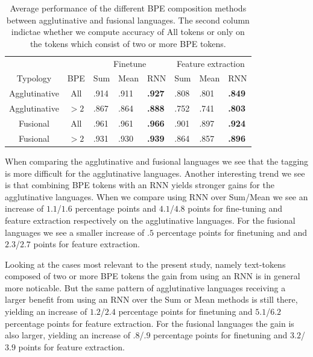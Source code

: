 \documentclass[11pt]{article}
\begin{document}
    \begin{table}
        \centering  
        \begin{tabular} {c|cllllll}
            & & \multicolumn{3}{c}{Finetune} & \multicolumn{3}{c}{Feature extraction} \\
            Typology & BPE & Sum & Mean & RNN & Sum & Mean & RNN \\
            \hline
            Agglutinative & All & .914 & .911 & \textbf{.927} & .808 & .801 & \textbf{.849} \\   
            Agglutinative & $>2$ & .867 & .864 & \textbf{.888} & .752 & .741 & \textbf{.803} \\
            Fusional & All & .961 & .961  & \textbf{.966} & .901 & .897 & \textbf{.924} \\
            Fusional & $>2$ & .931 & .930  & \textbf{.939} & .864 & .857 & \textbf{.896} \\
        \end{tabular}
     \caption{Average performance of the different BPE
     composition methods between agglutinative and fusional
     languages. The second column indictae whether we compute accuracy
     of All tokens or only on the tokens which consist of two or more
     BPE tokens. }
     \label{tab:typology_performace}
    \end{table}

        When comparing the agglutinative and fusional languages we see
     that the tagging is more difficult for the agglutinative
     languages. Another interesting trend we see is that combining BPE
     tokens with an RNN yields stronger gains for the agglutinative
     languages. When we compare using RNN over Sum/Mean we see an
     increase of $1.1$/$1.6$ percentage points and $4.1$/$4.8$ points
     for fine-tuning and feature extraction respectively on the
     agglutinative languages. For the fusional languages we see a
     smaller increase of $.5$ percentage points for finetuning and and
     $2.3$/$2.7$ points for feature extraction.

        Looking at the cases most relevant to the present study,
     namely text-tokens composed of two or more BPE tokens the gain
     from using an RNN is in general more noticable. But the same
     pattern of agglutinative languages receiving a larger benefit
     from using an RNN over the Sum or Mean methods is still there, yielding
     an increase of $1.2$/$2.4$ percentage points for finetuning and
     $5.1$/$6.2$ percentage points for feature extraction. For the
     fusional languages the gain is also larger, yielding an increase
     of $.8$/$.9$ percentage points for finetuning and $3.2$/$3.9$
     points for feature extraction.
     
\end{document}
